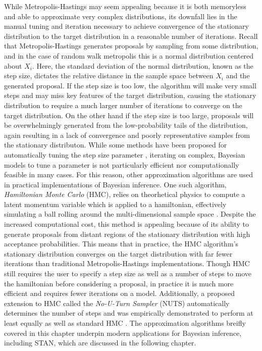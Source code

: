 \documentclass[
  12pt,
]{book}
\theoremstyle{definition}
\theoremstyle{definition}
\theoremstyle{definition}
\theoremstyle{remark}
\begin{document}
While Metropolis-Hastings may seem appealing because it is both memoryless and able to approximate very complex distributions, its downfall lies in the manual tuning and iteration necessary to achieve convergence of the stationary distribution to the target distribution in a reasonable number of iterations.
Recall that Metropolis-Hastings generates proposals by sampling from some distribution, and in the case of random walk metropolis this is a normal distribution centered about \(X_{i}\).
Here, the standard deviation of the normal distribution, known as the step size, dictates the relative distance in the sample space between \(X_{i}\) and the generated proposal.
If the step size is too low, the algorithm will make very small steps and may miss key features of the target distribution, causing the stationary distribution to require a much larger number of iterations to converge on the target distribution.
On the other hand if the step size is too large, proposals will be overwhelmingly generated from the low-probability tails of the distribution, again resulting in a lack of convergence and poorly representative samples from the stationary distributon.
While some methods have been proposed for automatically tuning the step size parameter \citep{Graves2011}, iterating on complex, Bayesian models to tune a parameter is not particularly efficient nor computationally feasible in many cases.
For this reason, other approximation algorithms are used in practical implementations of Bayesian inference.
One such algorithm, \emph{Hamiltonian Monte Carlo} (HMC), relies on theorhetical physics to compute a latent momentum variable which is applied to a hamiltonian, effectively simulating a ball rolling around the multi-dimensional sample space \citep{Brooks2011}.
Despite the increased computational cost, this method is appealing because of its ability to generate proposals from distant regions of the stationary distribution with high acceptance probabilities.
This means that in practice, the HMC algorithm's stationary distribution converges on the target distribution with far fewer iterations than traditional Metropolis-Hastings implementations.
Though HMC still requires the user to specify a step size as well as a number of steps to move the hamiltonian before considering a proposal, in practice it is much more efficient and requires fewer iterations on a model.
Additionally, a proposed extension to HMC called the \emph{No-U-Turn Sampler} (NUTS) automatically determines the number of steps and was empirically demonstrated to perform at least equally as well as standard HMC \citep{Homan2014}.
The approximation algorithms breifly covered in this chapter underpin modern applications for Bayesian inference, including STAN, which are discussed in the following chapter.
\end{document}
